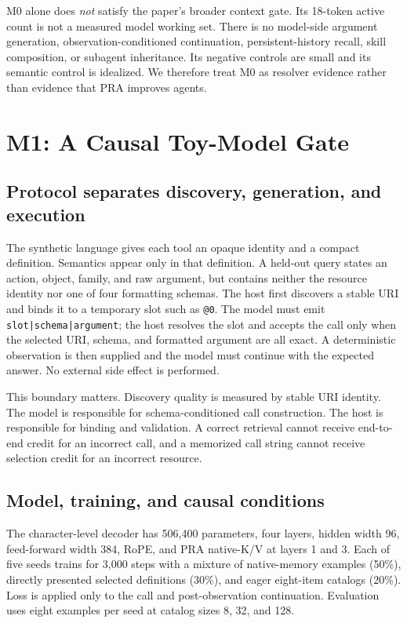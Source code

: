 M0 alone does \emph{not} satisfy the paper's broader context gate. Its 18-token
active count is not a measured model working set. There is no model-side
argument generation, observation-conditioned continuation, persistent-history
recall, skill composition, or subagent inheritance. Its negative controls are
small and its semantic control is idealized. We therefore treat M0 as resolver
evidence rather than evidence that PRA improves agents.

\section{M1: A Causal Toy-Model Gate}
\subsection{Protocol separates discovery, generation, and execution}
The synthetic language gives each tool an opaque identity and a compact
definition. Semantics appear only in that definition. A held-out query states
an action, object, family, and raw argument, but contains neither the resource
identity nor one of four formatting schemas. The host first discovers a stable
URI and binds it to a temporary slot such as \texttt{@0}. The model must emit
\texttt{slot|schema|argument}; the host resolves the slot and accepts the call
only when the selected URI, schema, and formatted argument are all exact. A
deterministic observation is then supplied and the model must continue with the
expected answer. No external side effect is performed.

This boundary matters. Discovery quality is measured by stable URI identity.
The model is responsible for schema-conditioned call construction. The host is
responsible for binding and validation. A correct retrieval cannot receive
end-to-end credit for an incorrect call, and a memorized call string cannot
receive selection credit for an incorrect resource.

\subsection{Model, training, and causal conditions}
The character-level decoder has 506,400 parameters, four layers, hidden width
96, feed-forward width 384, RoPE, and PRA native-K/V at layers 1 and 3. Each of
five seeds trains for 3,000 steps with a mixture of native-memory examples
(50\%), directly presented selected definitions (30\%), and eager eight-item
catalogs (20\%). Loss is applied only to the call and post-observation
continuation. Evaluation uses eight examples per seed at catalog sizes 8, 32,
and 128.

